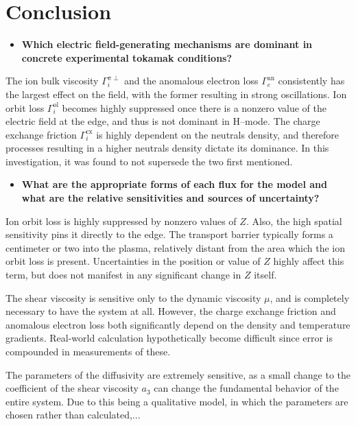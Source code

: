 \chapter{Conclusion}\label{chapter:conclusion}

\begin{itemize}
	\item \textbf{Which electric field-generating mechanisms are dominant in concrete experimental tokamak conditions?}
\end{itemize}

The ion bulk viscosity $\Gamma_i^{\pi\perp}$ and the anomalous electron loss $\Gamma_e^\text{an}$ consistently has the largest effect on the field, with the former resulting in strong oscillations.
Ion orbit loss $\Gamma_i^\text{ol}$ becomes highly suppressed once there is a nonzero value of the electric field at the edge, and thus is not dominant in H--mode.
The charge exchange friction $\Gamma_i^\text{cx}$ is highly dependent on the neutrals density, and therefore processes resulting in a higher neutrals density dictate its dominance.
In this investigation, it was found to not supersede the two first mentioned.


\begin{itemize}
	\item \textbf{What are the appropriate forms of each flux for the model and what are the relative sensitivities and sources of uncertainty?}
\end{itemize}

Ion orbit loss is highly suppressed by nonzero values of $Z$.
Also, the high spatial sensitivity pins it directly to the edge.
The transport barrier typically forms a centimeter or two into the plasma, relatively distant from the area which the ion orbit loss is present.
Uncertainties in the position or value of $Z$ highly affect this term, but does not manifest in any significant change in $Z$ itself.

The shear viscosity is sensitive only to the dynamic viscosity $\mu$, and is completely necessary to have the system at all.
However, the charge exchange friction and anomalous electron loss both significantly depend on the density and temperature gradients.
Real-world calculation hypothetically become difficult since error is compounded in measurements of these.

The parameters of the diffusivity are extremely sensitive, as a small change to the coefficient of the shear viscosity $a_3$ can change the fundamental behavior of the entire system.
Due to this being a qualitative model, in which the parameters are chosen rather than calculated,...


